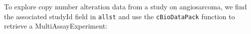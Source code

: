 
To explore copy number alteration data from a study on angiosarcoma,
we find the associated studyId field in \texttt{allst} and use the \texttt{cBioDataPack} function
to retrieve a MultiAssayExperiment:

